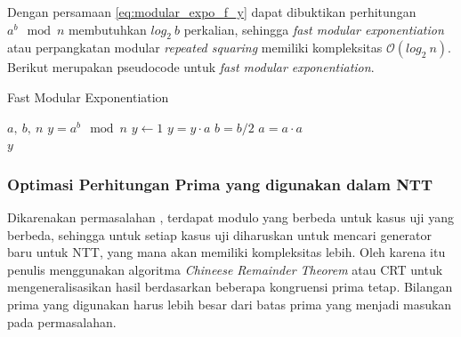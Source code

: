 Dengan persamaan \eqref{eq:modular_expo_f_y} dapat dibuktikan perhitungan $ a^b \mod{n} $ membutuhkan $ log_2\ b $ perkalian, sehingga \textit{fast modular exponentiation} atau perpangkatan modular \textit{repeated squaring} memiliki kompleksitas $ \mathcal{O}{(log_2\ n)} $. Berikut merupakan pseudocode untuk \textit{fast modular exponentiation}.
\begin{algorithm}
	\caption{Fast Modular Exponentiation}
	\label{psdo:fast_modex}
	\begin{algorithmic}[1]
		\Require $a,\ b,\ n$
		\Ensure $y = a^b\mod{n}$
		\State $y \leftarrow 1$
				\State $ y = y \cdot a $
			\EndIf
			\State $ b = b / 2 $
			\State $ a = a \cdot a $
		\EndWhile \\
		\Return $ y $
	\end{algorithmic}
\end{algorithm}

\subsubsection{Optimasi Perhitungan Prima yang digunakan dalam NTT}

Dikarenakan permasalahan \soal, terdapat modulo yang berbeda untuk kasus uji yang berbeda, sehingga untuk setiap kasus uji diharuskan untuk mencari generator baru untuk NTT, yang mana akan memiliki kompleksitas lebih. Oleh karena itu penulis menggunakan algoritma \textit{Chineese Remainder Theorem} atau CRT untuk mengeneralisasikan hasil berdasarkan beberapa kongruensi prima tetap. Bilangan prima yang digunakan harus lebih besar dari batas prima yang menjadi masukan pada permasalahan.

